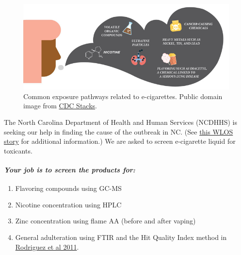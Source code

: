 \documentclass[]{tufte-book}
\providecommand{\tightlist}{%
  \setlength{\itemsep}{0pt}\setlength{\parskip}{0pt}}
\begin{document}
\begin{figure}
\centering
\includegraphics{../assets/img/e-cigarette-cdc.jpg}
\caption{Common exposure pathways related to e-cigarettes. Public domain image from \href{https://stacks.cdc.gov/gsearch?collection=\&terms=CS292347-A}{CDC Stacks}.}
\end{figure}

The North Carolina Department of Health and Human Services (NCDHHS) is seeking our help in finding the cause of the outbreak in NC. (See \href{https://wlos.com/news/local/nc-health-officials-report-3-cases-of-severe-lung-disease-after-vaping}{this WLOS story} for additional information.) We are asked to screen e-cigarette liquid for toxicants.

\hypertarget{your-job-is-to-screen-the-products-for}{%
\paragraph{\texorpdfstring{\emph{Your job is to screen the products for:}}{Your job is to screen the products for:}}\label{your-job-is-to-screen-the-products-for}}

\begin{enumerate}
\def\labelenumi{\arabic{enumi}.}
\tightlist
\item
  Flavoring compounds using GC-MS\\
\item
  Nicotine concentration using HPLC\\
\item
  Zinc concentration using flame AA (before and after vaping)\\
\item
  General adulteration using FTIR and the Hit Quality Index method in \href{https://www.researchgate.net/profile/John_Clarkson6/post/What_are_some_good_reference_bands_for_Raman_spectroscopy/attachment/59d6244c79197b8077982a27/AS\%3A312109580128257\%401451424130311/download/Standardization+of+Raman+spectra+for+transfer+of+spectral+libraries+across+different+instruments.pdf}{Rodriguez et al 2011}.
\end{enumerate}
\end{document}
